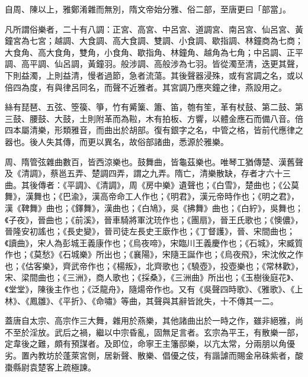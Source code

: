 
\begin{pinyinscope}

 自周、陳以上，雅鄭淆雜而無別，隋文帝始分雅、俗二部，至唐更曰「部當」。



 凡所謂俗樂者，二十有八調：正宮、高宮、中呂宮、道調宮、南呂宮、仙呂宮、黃鐘宮為七宮；越調、大食調、高大食調、雙調、小食調、歇指調、林鐘商為七商；大食角、高大食角，雙角，小食角、歇指角、林鐘角、越角為七角；中呂調、正平調、高平調、仙呂調，黃鐘羽。般涉調、高般涉為七羽。皆從濁至清，迭更其聲，下則益濁，上則益清，慢者過節，急者流蕩。其後聲器浸殊，或有宮調之名，或以倍四為度，有與律呂同名，而聲不近雅者。其宮調乃應夾鐘之律，燕設用之。



 絲有琵琶、五弦、箜篌、箏，竹有觱篥、簫、笛，匏有笙，革有杖鼓、第二鼓、第三鼓、腰鼓、大鼓，土則附革而為鞡，木有拍板、方響，以體金應石而備八音。倍四本屬清樂，形類雅音，而曲出於胡部。復有銀字之名，中管之格，皆前代應律之器也。後人失其傳，而更以異名，故俗部諸曲，悉源於雅樂。



 周、隋管弦雜曲數百，皆西涼樂也。鼓舞曲，皆龜茲樂也。唯琴工猶傳楚、漢舊聲及《清調》，蔡邕五弄、楚調四弄，謂之九弄。隋亡，清樂散缺，存者才六十三曲。其後傳者：《平調》、《清調》，周《房中樂》遺聲也；《白雪》，楚曲也；《公莫舞》，漢舞也；《巴渝》，漢高帝命工人作也；《明君》，漢元帝時作也；《明之君》，漢《鞞舞》曲也；《鐸舞》，漢曲也；《白鳩》，吳《拂舞》曲也；《白紵》，吳舞也；《子夜》，晉曲也；《前溪》，晉車騎將軍沈珫作也；《團扇》，晉王氏歌也；《懊儂》，晉隆安初謠也；《長史變》，晉司徒左長史王廞作也；《丁督護》，晉、宋間曲也；《讀曲》，宋人為彭城王義康作也；《烏夜啼》，宋臨川王義慶作也；《石城》，宋臧質作也；《莫愁》《石城樂》所出也；《襄陽》，宋隨王誕作也；《烏夜飛》，宋沈攸之作也；《估客樂》，齊武帝作也；《楊叛》，北齊歌也；《驍壺》，投壺樂也；《常林歡》，宋、梁間曲也；《三洲》，商人歌也；《採桑》，《三洲曲》所出也；《玉樹後庭花》、《堂堂》，陳後主作也；《泛龍舟》，隨煬帝作也。又有《吳聲四時歌》、《雅歌》、《上林》、《鳳雛》、《平折》、《命嘯》等曲，其聲與其辭皆訛失，十不傳其一二。



 蓋唐自太宗、高宗作三大舞，雜用於燕樂，其他諸曲出於一時之作，雖非絕雅，尚不至於淫放。武后之禍，繼以中宗昏亂，固無足言者。玄宗為平王，有散樂一部，定韋後之難，頗有預謀者。及即位，命寧王主籓邸樂，以亢太常，分兩朋以角優劣。置內教坊於蓬萊宮側，居新聲、散樂、倡優之伎，有諧謔而賜金帛硃紫者，酸棗縣尉袁楚客上疏極諫。




\end{pinyinscope}
